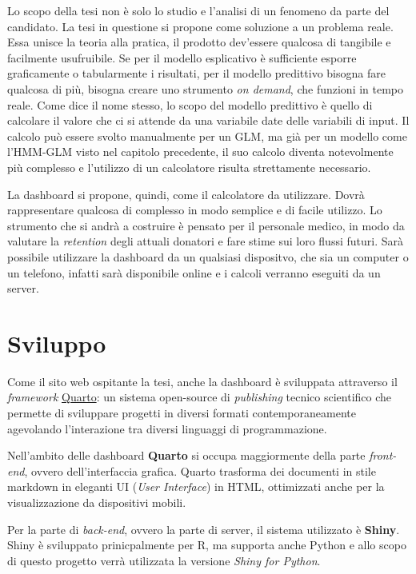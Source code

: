 \documentclass[
  italian,
  a4paper,
  a4paper,
  twoside,
  open=right,
  12pt]{scrbook}
\theoremstyle{definition}
\theoremstyle{remark}
\begin{document}
Lo scopo della tesi non è solo lo studio e l'analisi di un fenomeno da
parte del candidato. La tesi in questione si propone come soluzione a un
problema reale. Essa unisce la teoria alla pratica, il prodotto
dev'essere qualcosa di tangibile e facilmente usufruibile. Se per il
modello esplicativo è sufficiente esporre graficamente o tabularmente i
risultati, per il modello predittivo bisogna fare qualcosa di più,
bisogna creare uno strumento \emph{on demand}, che funzioni in tempo
reale. Come dice il nome stesso, lo scopo del modello predittivo è
quello di calcolare il valore che ci si attende da una variabile date
delle variabili di input. Il calcolo può essere svolto manualmente per
un GLM, ma già per un modello come l'HMM-GLM visto nel capitolo
precedente, il suo calcolo diventa notevolmente più complesso e
l'utilizzo di un calcolatore risulta strettamente necessario.

La dashboard si propone, quindi, come il calcolatore da utilizzare.
Dovrà rappresentare qualcosa di complesso in modo semplice e di facile
utilizzo. Lo strumento che si andrà a costruire è pensato per il
personale medico, in modo da valutare la \emph{retention} degli attuali
donatori e fare stime sui loro flussi futuri. Sarà possibile utilizzare
la dashboard da un qualsiasi dispositvo, che sia un computer o un
telefono, infatti sarà disponibile online e i calcoli verranno eseguiti
da un server.

\section{Sviluppo}\label{sviluppo}

Come il sito web ospitante la tesi, anche la dashboard è sviluppata
attraverso il \emph{framework} \href{https://quarto.org/}{Quarto}: un
sistema open-source di \emph{publishing} tecnico scientifico che
permette di sviluppare progetti in diversi formati contemporaneamente
agevolando l'interazione tra diversi linguaggi di programmazione.

Nell'ambito delle dashboard \textbf{Quarto} si occupa maggiormente della
parte \emph{front-end}, ovvero dell'interfaccia grafica. Quarto
trasforma dei documenti in stile markdown in eleganti UI (\emph{User
Interface}) in HTML, ottimizzati anche per la visualizzazione da
dispositivi mobili.

Per la parte di \emph{back-end}, ovvero la parte di server, il sistema
utilizzato è \textbf{Shiny}. Shiny è sviluppato prinicpalmente per R, ma
supporta anche Python e allo scopo di questo progetto verrà utilizzata
la versione \emph{Shiny for Python}.
\end{document}
